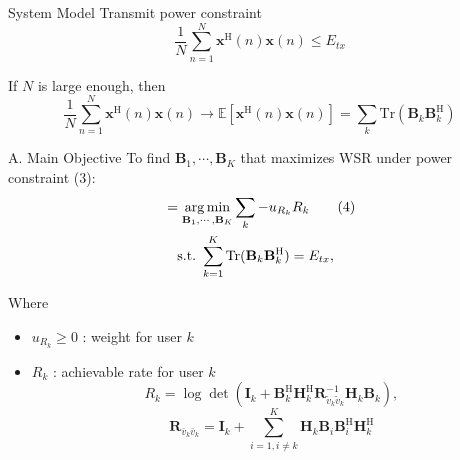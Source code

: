 \documentclass[aspectratio=169, 10pt]{beamer}
\begin{document}
\begin{frame}[label=main-power_constraint]{System Model}
    Transmit power constraint
    \begin{equation}
        \frac{1}{N} \sum_{n=1}^N \mathbf{x}^\mathrm{H}(n) \mathbf{x}(n) \le E_{tx} \tag{3}
    \end{equation}

    I{}f $N$ is large enough, then
    \begin{equation}
        \frac{1}{N} \sum_{n=1}^N \mathbf{x}^\mathrm{H}(n) \mathbf{x}(n) \rightarrow
        \mathbb{E}[\mathbf{x}^\mathrm{H}(n)\mathbf{x}(n)] =
        \sum_k \mathrm{Tr}(\mathbf{B}_k\mathbf{B}_k^\mathrm{H}) \tag{3a}
    \end{equation}
    \begin{flushright}
        \hyperlink{app-power_constraint}{}
    \end{flushright}

\end{frame}

\begin{frame}{A. Main Objective}
    To find $\mathbf{B}_1, \cdots , \mathbf{B}_K$ that maximizes WSR under power constraint (3):
    \begin{align}
        [\mathbf{B}_1^{\mathrm{WSR}}, \cdots, \mathbf{B}_K^{\mathrm{WSR}}]
         & = \underset{\mathbf{B}_1, \cdots, \mathbf{B}_K}{\operatorname{arg\,min}}
        \sum_k -u_{R_k} R_k \tag{4}
        \\& \quad \mathrm{s.t.} \ \sum_{k=1}^K \mathrm{Tr}(\mathbf{B}_k \mathbf{B}_k^\mathrm{H}) = E_{tx}, \notag
    \end{align}

    Where
    \begin{itemize}
        \item $u_{R_k} \ge 0$ : weight for user $k$
        \item $R_k$ : achievable rate for user $k$
              \begin{equation}
                  R_k=\log \operatorname{det}\left(\mathbf{I}_k+\mathbf{B}_k^{\mathrm{H}} \mathbf{H}_k^{\mathrm{H}} \mathbf{R}_{\tilde{v}_k \tilde{v}_k}^{-1} \mathbf{H}_k \mathbf{B}_k\right),
                  \tag{5}
              \end{equation}
              \begin{equation}
                  \mathbf{R}_{\bar{v}_k \bar{v}_k}=\mathbf{I}_k+\sum_{i=1, i \neq k}^K \mathbf{H}_k \mathbf{B}_i \mathbf{B}_i^{\mathrm{H}} \mathbf{H}_k^{\mathrm{H}}
                  \tag{6}
              \end{equation}
    \end{itemize}
\end{frame}
\end{document}
